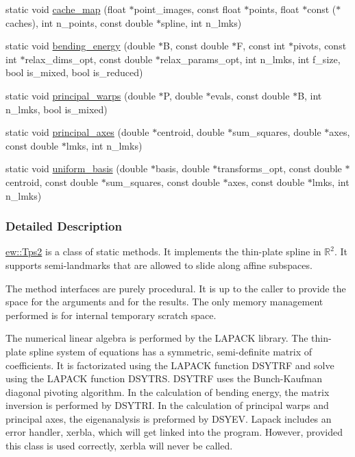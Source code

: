 \begin{DoxyCompactItemize}
static void \hyperlink{classew_1_1Tps2_a5f93e0fa0968fc5eeafaed40b67ef42d}{cache\_\-map} (float $\ast$point\_\-images, const float $\ast$points, float $\ast$const ($\ast$caches), int n\_\-points, const double $\ast$spline, int n\_\-lmks)
\item 
static void \hyperlink{classew_1_1Tps2_ae477299ee76bf61bd50e98b12bee66ce}{bending\_\-energy} (double $\ast$B, const double $\ast$F, const int $\ast$pivots, const int $\ast$relax\_\-dims\_\-opt, const double $\ast$relax\_\-params\_\-opt, int n\_\-lmks, int f\_\-size, bool is\_\-mixed, bool is\_\-reduced)
\item 
static void \hyperlink{classew_1_1Tps2_a3b57b449429ebeb46eaf63c098107698}{principal\_\-warps} (double $\ast$P, double $\ast$evals, const double $\ast$B, int n\_\-lmks, bool is\_\-mixed)
\item 
static void \hyperlink{classew_1_1Tps2_aa5177ff7fb842da0e20f153c1b992765}{principal\_\-axes} (double $\ast$centroid, double $\ast$sum\_\-squares, double $\ast$axes, const double $\ast$lmks, int n\_\-lmks)
\item 
static void \hyperlink{classew_1_1Tps2_aaca568d43a1711ad009bdee2cc14c011}{uniform\_\-basis} (double $\ast$basis, double $\ast$transforms\_\-opt, const double $\ast$centroid, const double $\ast$sum\_\-squares, const double $\ast$axes, const double $\ast$lmks, int n\_\-lmks)
\end{DoxyCompactItemize}


\subsubsection{Detailed Description}
\hyperlink{classew_1_1Tps2}{ew::Tps2} is a class of static methods. It implements the thin-\/plate spline in $\mathbb{R}^2$. It supports semi-\/landmarks that are allowed to slide along affine subspaces.

The method interfaces are purely procedural. It is up to the caller to provide the space for the arguments and for the results. The only memory management performed is for internal temporary scratch space.

The numerical linear algebra is performed by the LAPACK library. The thin-\/plate spline system of equations has a symmetric, semi-\/definite matrix of coefficients. It is factorizated using the LAPACK function {\ttfamily DSYTRF} and solve using the LAPACK function {\ttfamily DSYTRS}. {\ttfamily DSYTRF} uses the Bunch-\/Kaufman diagonal pivoting algorithm. In the calculation of bending energy, the matrix inversion is performed by {\ttfamily DSYTRI}. In the calculation of principal warps and principal axes, the eigenanalysis is preformed by {\ttfamily DSYEV}. Lapack includes an error handler, {\ttfamily xerbla}, which will get linked into the program. However, provided this class is used correctly, {\ttfamily xerbla} will never be called.

